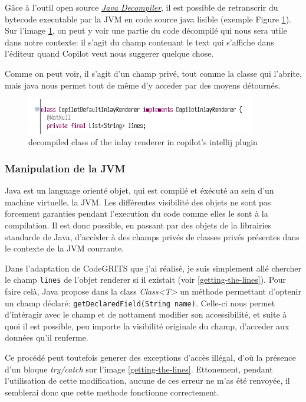 Gâce à l'outil open source \emph{\href{https://java-decompiler.github.io/}{Java Decompiler}}, il est possible de retranscrir du bytecode executable par la JVM en code source java lisible (exemple Figure \ref{copilot-inlay-renderer}).
Sur l'image \ref{copilot-inlay-renderer}, on peut y voir une partie du code décompilé qui nous sera utile dans notre contexte: il s'agit du champ contenant le text qui s'affiche dans l'éditeur
quand Copilot veut nous suggerer quelque chose.

Comme on peut voir, il s'agit d'un champ privé, tout comme la classe qui l'abrite, mais java nous permet tout de même d'y acceder par des moyens détournés.

\begin{figure}
	\centering
	\includegraphics[width=10cm]{images/copilot-renderer-class.png}
	\caption{decompiled class of the inlay renderer in copilot's intellij plugin}
	\label{copilot-inlay-renderer}
\end{figure}


\subsubsection{Manipulation de la JVM}

Java est un language orienté objet, qui est compilé et éxécuté au sein d'un machine virtuelle, la JVM.
Les différentes visibilité des objets ne sont pas forcement garanties pendant l'execution du code comme elles le sont à la compilation.
Il est donc possible, en passant par des objets de la librairies standarde de Java, d'accèder à des champs privés de classes privés présentes
dans le contexte de la JVM courrante.

Dans l'adaptation de CodeGRITS que j'ai réalisé, je suis simplement allé chercher le champ \lstinline{lines} de l'objet renderer si il existait (voir \ref{getting-the-lines}).
Pour faire celà, Java propose dans la class \emph{Class<T>} un méthode permettant d'optenir un champ déclaré: \lstinline{getDeclaredField(String name)}.
Celle-ci nous permet d'intéragir avec le champ et de nottament modifier son accessibilité, et suite à quoi il est possible, peu importe la visibilité originale du champ,
d'acceder aux données qu'il renferme.

Ce procédé peut toutefois generer des exceptions d'accès illégal, d'où la présence d'un bloque \emph{try/catch} sur l'image \ref{getting-the-lines}.
Ettonement, pendant l'utilisation de cette modification, aucune de ces erreur ne m'as été renvoyée, il semblerai donc que cette methode fonctionne correctement.

